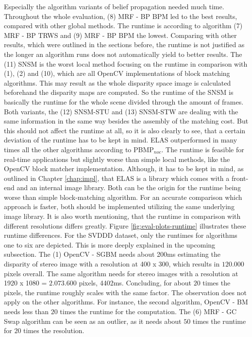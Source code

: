 \noindent Especially the algorithm variants of belief propagation needed much time.
Throughout the whole evaluation, (8) MRF - BP BPM led to the best results, compared with other global methods.
The runtime is according to algorithm (7) MRF - BP TRWS and (9) MRF - BP BPM the lowest.
Comparing with other results, which were outlined in the sections before, the runtime is not justified as the longer an algorithm runs does not automatically yield to better results.
\newline\newline\noindent The (11) SNSM is the worst local method focusing on the runtime in comparison with (1), (2) and (10), which are all OpenCV implementations of block matching algorithms.
This may result as the whole disparity space image is calculated beforehand the disparity maps are computed.
So the runtime of the SNSM is basically the runtime for the whole scene divided through the amount of frames.
Both variants, the (12) SNSM-STU and (13) SNSM-STW are dealing with the same information in the same way besides the assembly of the matching cost.
But this should not affect the runtime at all, so it is also clearly to see, that a certain deviation of the runtime has to be kept in mind.
\newline\newline\noindent ELAS outperformed in many times all the other algorithms according to PBMP$_{noc}$.
The runtime is feasible for real-time applications but slightly worse than simple local methods, like the OpenCV block matcher implementation.
Although, it has to be kept in mind, as outlined in Chapter \ref{chap:impl}, that ELAS is a library which comes with a front-end and an internal image library.
Both can be the origin for the runtime being worse than simple block-matching algorithm.
For an accurate comparison which approach is faster, both should be implemented utilizing the same underlying image library.
\newline\newline\noindent It is also worth mentioning, that the runtime in comparison with different resolutions differs greatly.
Figure \ref{fig:eval-plots-runtime} illustrates these runtime differences.
For the SVDDD dataset, only the runtimes for algorithms one to six are depicted.
This is more deeply explained in the upcoming subsection.
\newline\newline\noindent The (1) OpenCV - SGBM needs about 200ms estimating the disparity of stereo image with a resolution at 400 x 300, which results in $120.000$ pixels overall.
The same algorithm needs for stereo images with a resolution at 1920 x 1080 = $2.073.600$ pixels, 4402ms.
Concluding, for about $20$ times the pixels, the runtime roughly scales with the same factor.
The observation does not apply on the other algorithms.
For instance, the second algorithm, OpenCV - BM needs less than $20$ times the runtime for the computation.
The (6) MRF - GC Swap algorithm can be seen as an outlier, as it needs about $50$ times the runtime for $20$ times the resolution.

